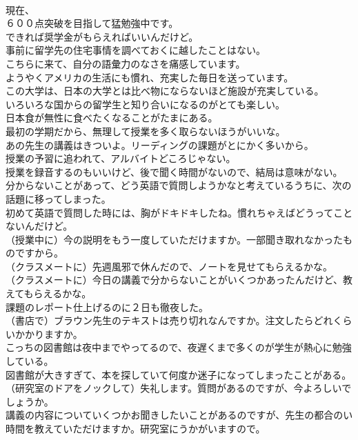 \documentclass[8pt]{extreport}
\begin{document}
\begin{CJK}{UTF8}{min}
\\	現在、
\\	６００点突破を目指して猛勉強中です。	
\\	できれば奨学金がもらえればいいんだけど。	
\\	事前に留学先の住宅事情を調べておくに越したことはない。	
\\	こちらに来て、自分の語彙力のなさを痛感しています。	
\\	ようやくアメリカの生活にも慣れ、充実した毎日を送っています。	
\\	この大学は、日本の大学とは比べ物にならないほど施設が充実している。	
\\	いろいろな国からの留学生と知り合いになるのがとても楽しい。	
\\	日本食が無性に食べたくなることがたまにある。	
\\	最初の学期だから、無理して授業を多く取らないほうがいいな。	
\\	あの先生の講義はきついよ。リーディングの課題がとにかく多いから。	
\\	授業の予習に追われて、アルバイトどころじゃない。	
\\	授業を録音するのもいいけど、後で聞く時間がないので、結局は意味がない。	
\\	分からないことがあって、どう英語で質問しようかなと考えているうちに、次の話題に移ってしまった。	
\\	初めて英語で質問した時には、胸がドキドキしたね。慣れちゃえばどうってことないんだけど。	
\\	（授業中に）今の説明をもう一度していただけますか。一部聞き取れなかったものですから。	
\\	（クラスメートに）先週風邪で休んだので、ノートを見せてもらえるかな。	
\\	（クラスメートに）今日の講義で分からないことがいくつかあったんだけど、教えてもらえるかな。	
\\	課題のレポート仕上げるのに２日も徹夜した。	
\\	（書店で）ブラウン先生のテキストは売り切れなんですか。注文したらどれくらいかかりますか。	
\\	こっちの図書館は夜中までやってるので、夜遅くまで多くのが学生が熱心に勉強している。	
\\	図書館が大きすぎて、本を探していて何度か迷子になってしまったことがある。	
\\	（研究室のドアをノックして）失礼します。質問があるのですが、今よろしいでしょうか。	
\\	講義の内容についていくつかお聞きしたいことがあるのですが、先生の都合のい時間を教えていただけますか。研究室にうかがいますので。	

\end{CJK}
\end{document}

